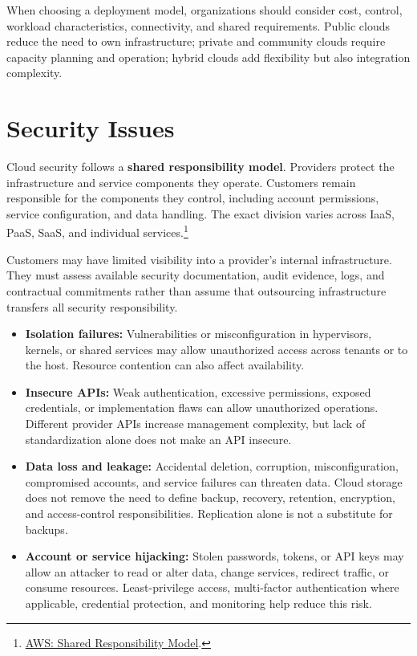 When choosing a deployment model, organizations should consider cost, control, workload characteristics, connectivity, and shared requirements. Public clouds reduce the need to own infrastructure; private and community clouds require capacity planning and operation; hybrid clouds add flexibility but also integration complexity.

\section{Security Issues}
Cloud security follows a \textbf{shared responsibility model}. Providers protect the infrastructure and service components they operate. Customers remain responsible for the components they control, including account permissions, service configuration, and data handling. The exact division varies across IaaS, PaaS, SaaS, and individual services.\footnote{\href{https://aws.amazon.com/compliance/shared-responsibility-model/}{AWS: Shared Responsibility Model}.}

Customers may have limited visibility into a provider's internal infrastructure. They must assess available security documentation, audit evidence, logs, and contractual commitments rather than assume that outsourcing infrastructure transfers all security responsibility.

\begin{itemize}
  \item \textbf{Isolation failures:} Vulnerabilities or misconfiguration in hypervisors, kernels, or shared services may allow unauthorized access across tenants or to the host. Resource contention can also affect availability.
  \item \textbf{Insecure APIs:} Weak authentication, excessive permissions, exposed credentials, or implementation flaws can allow unauthorized operations. Different provider APIs increase management complexity, but lack of standardization alone does not make an API insecure.
  \item \textbf{Data loss and leakage:} Accidental deletion, corruption, misconfiguration, compromised accounts, and service failures can threaten data. Cloud storage does not remove the need to define backup, recovery, retention, encryption, and access-control responsibilities. Replication alone is not a substitute for backups.
  \item \textbf{Account or service hijacking:} Stolen passwords, tokens, or API keys may allow an attacker to read or alter data, change services, redirect traffic, or consume resources. Least-privilege access, multi-factor authentication where applicable, credential protection, and monitoring help reduce this risk.
\end{itemize}
